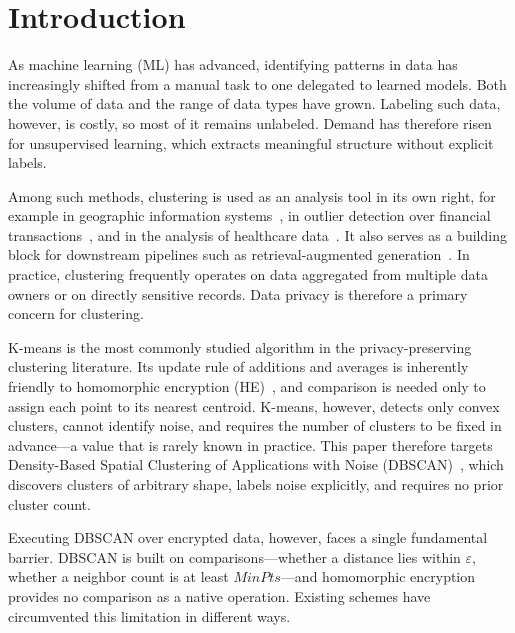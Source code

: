 \section{Introduction}
\label{sec:intro}

As machine learning (ML) has advanced, identifying patterns in data has
increasingly shifted from a manual task to one delegated to learned
models. Both the volume of data and the range of data types have grown.
Labeling such data, however, is costly, so most of it remains unlabeled.
Demand has therefore risen for unsupervised learning, which extracts
meaningful structure without explicit labels.

Among such methods, clustering is used as an analysis tool in its own
right, for example in geographic information
systems~\cite{tu2022dbscan}, in outlier detection over
financial transactions~\cite{yang2014dbscan,ahmed2016survey}, and in the
analysis of healthcare data~\cite{khanizadeh2025smart,ahlqvist2018novel}.
It also serves as a building block for downstream pipelines such as
retrieval-augmented generation~\cite{sarthi2024raptor,edge2024local}.
In practice, clustering frequently operates on data aggregated from
multiple data owners or on directly sensitive records. Data privacy is
therefore a primary concern for clustering.

K-means is the most commonly studied algorithm in the privacy-preserving
clustering literature. Its update rule of additions and averages is
inherently friendly to homomorphic encryption (HE)~\cite{gentry2009fully},
and comparison is needed only to assign each point to its nearest
centroid. K-means, however, detects only convex clusters, cannot identify
noise, and requires the number of clusters to be fixed in advance---a
value that is rarely known in practice. This paper therefore targets Density-Based Spatial Clustering
of Applications with Noise (DBSCAN)~\cite{ester1996density}, which
discovers clusters of arbitrary shape, labels noise explicitly, and
requires no prior cluster count.

Executing DBSCAN over encrypted data, however, faces a single fundamental
barrier. DBSCAN is built on comparisons---whether a distance lies within
$\varepsilon$, whether a neighbor count is at least $\mathit{MinPts}$---and
homomorphic encryption provides no comparison as a native operation.
Existing schemes have circumvented this limitation in different ways.

